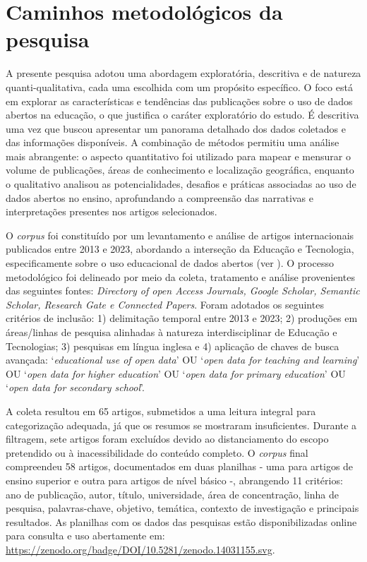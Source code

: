 \documentclass[portuguese]{textolivre}
\begin{document}
\section{Caminhos metodológicos da pesquisa}\label{sec-conduta}
A presente pesquisa adotou uma abordagem exploratória, descritiva e de natureza quanti-qualitativa, cada uma escolhida com um propósito específico. O foco está em explorar as características e tendências das publicações sobre o uso de dados abertos na educação, o que justifica o caráter exploratório do estudo. É descritiva uma vez que buscou apresentar um panorama detalhado dos dados coletados e das informações disponíveis. 
A combinação de métodos permitiu uma análise mais abrangente: o aspecto quantitativo foi utilizado para mapear e mensurar o volume de publicações, áreas de conhecimento e localização geográfica, enquanto o qualitativo analisou as potencialidades, desafios e práticas associadas ao uso de dados abertos no ensino, aprofundando a compreensão das narrativas e interpretações presentes nos artigos selecionados.

O \textit{corpus} foi constituído por um levantamento e análise de artigos internacionais publicados entre 2013 e 2023, abordando a interseção da Educação e Tecnologia, especificamente sobre o uso educacional de dados abertos (ver ). O processo metodológico foi delineado por meio da coleta, tratamento e análise provenientes das seguintes fontes: \textit{Directory of open Access Journals, Google Scholar, Semantic Scholar, Research Gate e Connected Papers}. Foram adotados os seguintes critérios de inclusão: 1) delimitação temporal entre 2013 e 2023; 2) produções em áreas/linhas de pesquisa alinhadas à natureza interdisciplinar de Educação e Tecnologias; 3) pesquisas em língua inglesa e 4) aplicação de chaves de busca avançada: ‘\textit{educational use of open data}’ OU ‘\textit{open data for teaching and learning}’ OU ‘\textit{open data for higher education}’ OU ‘\textit{open data for primary education}’ OU ‘\textit{open data for secondary school}’. 

A coleta resultou em 65 artigos, submetidos a uma leitura integral para categorização adequada, já que os resumos se mostraram insuficientes. Durante a filtragem, sete artigos foram excluídos devido ao distanciamento do escopo pretendido ou à inacessibilidade do conteúdo completo. O \textit{corpus} final compreendeu 58 artigos, documentados em duas planilhas - uma para artigos de ensino superior e outra para artigos de nível básico -, abrangendo 11 critérios: ano de publicação, autor, título, universidade, área de concentração, linha de pesquisa, palavras-chave, objetivo, temática, contexto de investigação e principais resultados. As planilhas com os dados das pesquisas estão disponibilizadas online para consulta e uso abertamente em: \url{https://zenodo.org/badge/DOI/10.5281/zenodo.14031155.svg}.
\end{document}
